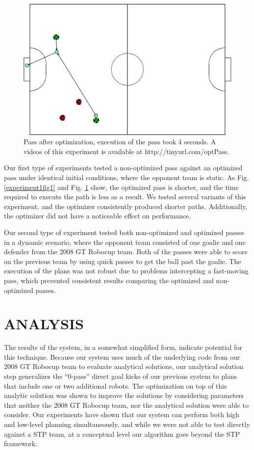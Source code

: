 \documentclass[a4paper, 10pt, conference]{ieeeconf}      %
\begin{document}
\begin{figure}[ht!]
\begin{center}
\includegraphics[totalheight=1.6in]{optimized_plan}
\end{center}
\caption{Pass after optimization, execution of the pass took 4 seconds. A videos of this experiment is available at http://tinyurl.com/optPass.}
\label{experiment1fig2}
\end{figure}

Our first type of experiments tested a non-optimized pass against an optimized pass under identical initial conditions, where the opponent team is static. As Fig. \ref{experiment1fig1} and Fig. \ref{experiment1fig2} show, the optimized pass is shorter, and the time required to execute the path is less as a result. We tested several variants of this experiment, and the optimizer consistently produced shorter paths. Additionally, the optimizer did not have a noticeable effect on performance.

Our second type of experiment tested both non-optimized and optimized passes in a dynamic scenario, where the opponent team consisted of one goalie and one defender from the 2008 GT Robocup team. Both of the passes were able to score on the previous team by using quick passes to get the ball past the goalie. The execution of the plans was not robust due to problems intercepting a fast-moving pass, which prevented consistent results comparing the optimized and non-optimized passes.

\section{ANALYSIS}
The results of the system, in a somewhat simplified form, indicate potential for this technique. Because our system uses much of the underlying code from our 2008 GT Robocup team to evaluate analytical solutions, our analytical solution step generalizes the ``0-pass'' direct goal kicks of our previous system to plans that include one or two additional robots. The optimization on top of this analytic solution was shown to improve the solutions by considering parameters that neither the 2008 GT Robocup team, nor the analytical solution were able to consider.
Our experiments have shown that our system can perform both high and low-level planning simultaneously, and while we were not able to test directly against a STP team, at a conceptual level our algorithm goes beyond the STP framework.
\end{document}
